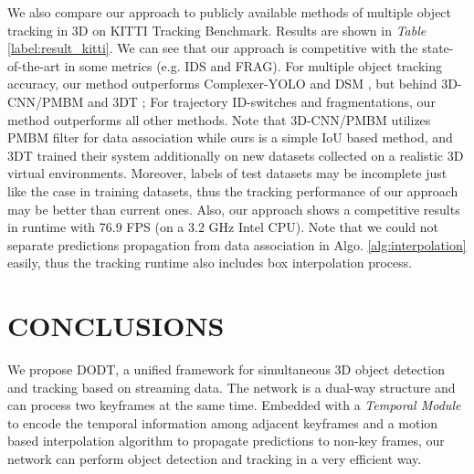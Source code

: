 \documentclass[letterpaper, 10pt, conference]{ieeeconf}  %
\def\tablename{\emph{Table}}
\begin{document}
We also compare our approach to publicly available methods of multiple object tracking in 3D on KITTI Tracking Benchmark. Results are shown in \tablename \, \ref{label:result_kitti}. We can see that our approach is competitive with the state-of-the-art in some metrics (e.g. IDS and FRAG). For multiple object tracking accuracy, our method outperforms Complexer-YOLO \cite{Simon_2019_CVPR_Workshops} and DSM \cite{frossard2018end}, but behind 3D-CNN/PMBM \cite{scheidegger2018mono} and 3DT \cite{Hu3DT19}; For trajectory ID-switches and fragmentations, our method outperforms all other methods. Note that 3D-CNN/PMBM utilizes PMBM filter for data association while ours is a simple IoU based method, and 3DT trained their system additionally on new datasets collected on a realistic 3D virtual environments. Moreover, labels of test datasets may be incomplete just like the case in training datasets, thus the tracking performance of our approach may be better than current ones. Also, our approach shows a competitive results in runtime with 76.9 FPS (on a  3.2 GHz Intel CPU). Note that we could not separate predictions propagation from data association in Algo. \ref{alg:interpolation} easily, thus the tracking runtime also includes box interpolation process.

\section{CONCLUSIONS}
\label{sec:conclusions} We propose DODT, a unified framework for simultaneous 3D object detection and tracking based on streaming data. The network is a dual-way structure and can  process two keyframes at the same time. Embedded with a \textit{Temporal Module} to encode the temporal information among adjacent keyframes and a motion based interpolation algorithm to propagate predictions to non-key frames, our network can perform object detection and tracking in a very efficient way. 




\end{document}
